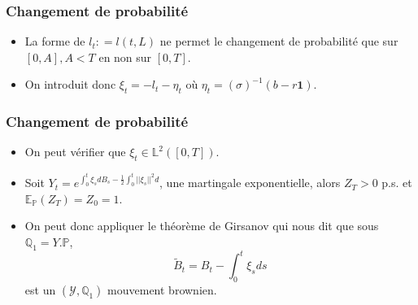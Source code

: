 \documentclass{beamer}
\begin{document}
\begin{frame}
\frametitle{Changement de probabilité}
\begin{itemize}
\item La forme de $l_t : = l(t, L)$ ne permet le changement de probabilité que sur $[0, A], A<T$ en non sur $[0, T]$. 
\item On introduit donc $\xi_t = -l_t - \eta_t$ où $\eta_t = (\sigma)^{-1} (b - r\textbf{1})$.
\end{itemize}

\end{frame}

\begin{frame}
\frametitle{Changement de probabilité}
\begin{itemize}
\item On peut vérifier que $\xi_t \in \mathbb{L}^2([0, T])$.
\item Soit $Y_t = e^{ \int_{0}^{t} \xi_s dB_s - \frac{1}{2} \int_{0}^{t} ||\xi_s||^2 d}$, une martingale exponentielle, alors $Z_T > 0$ p.s. et $\mathbb{E}_{\mathbb{P}} (Z_T) = Z_0 = 1$.\\
\item On peut donc appliquer le théorème de Girsanov qui nous dit que sous $\mathbb{Q}_1 = Y. \mathbb{P}$, 
\begin{equation*}
\tilde{B}_t = B_t - \displaystyle \int_{0}^{t}\xi_s ds
\end{equation*}
est un $(\mathcal{Y}, \mathbb{Q}_1)$ mouvement brownien.
\end{itemize}


 
 

\end{frame}
\end{document}
